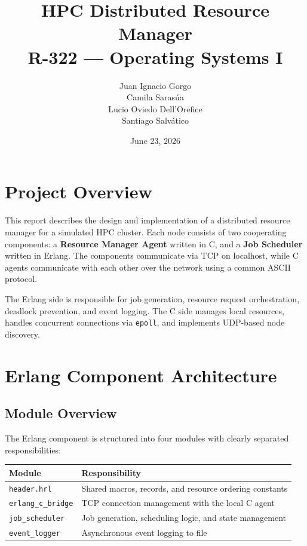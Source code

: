\documentclass[12pt,a4paper]{article}
\title{\textbf{HPC Distributed Resource Manager}\\[0.3em]\normalsize R-322 --- Operating Systems I}
\author{
Juan Ignacio Gorgo \\
Camila Sarasúa \\
Lucio Oviedo Dell'Orefice \\
Santiago Salvático
}
\date{June 23, 2026}
\begin{document}
\maketitle
\thispagestyle{fancy}
\tableofcontents
\newpage

\section{Project Overview}

This report describes the design and implementation of a distributed resource manager
for a simulated HPC cluster. Each node consists of two cooperating components:
a \textbf{Resource Manager Agent} written in C, and a \textbf{Job Scheduler} written in Erlang.
The components communicate via TCP on localhost, while C agents communicate with each
other over the network using a common ASCII protocol.

The Erlang side is responsible for job generation, resource request orchestration,
deadlock prevention, and event logging. The C side manages local resources, handles
concurrent connections via \texttt{epoll}, and implements UDP-based node discovery.

\section{Erlang Component Architecture}

\subsection{Module Overview}

The Erlang component is structured into four modules with clearly separated responsibilities:

\begin{center}
\begin{tabular}{ll}
\toprule
\textbf{Module} & \textbf{Responsibility} \\
\midrule
\texttt{header.hrl}         & Shared macros, records, and resource ordering constants \\
\texttt{erlang\_c\_bridge}  & TCP connection management with the local C agent \\
\texttt{job\_scheduler}     & Job generation, scheduling logic, and state management \\
\texttt{event\_logger}      & Asynchronous event logging to file \\
\bottomrule
\end{tabular}
\end{center}
\end{document}
